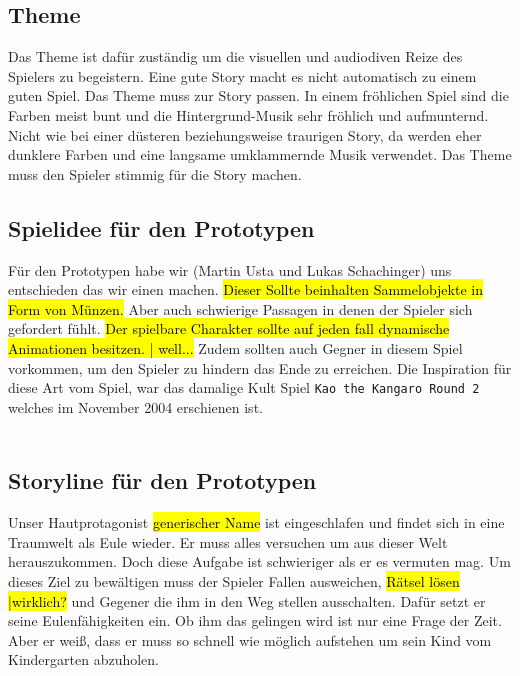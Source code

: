 \subsection{Theme}
Das Theme ist dafür zuständig um die visuellen und audiodiven Reize des Spielers zu begeistern. Eine gute Story macht es nicht automatisch zu einem guten Spiel. Das Theme muss zur Story passen. In einem fröhlichen Spiel sind die Farben meist bunt und die Hintergrund-Musik sehr fröhlich und aufmunternd. Nicht wie bei einer düsteren beziehungsweise traurigen Story, da werden eher dunklere Farben und eine langsame umklammernde Musik verwendet. Das Theme muss den Spieler stimmig für die Story machen.


\subsection{Spielidee für den Prototypen}
Für den Prototypen habe wir (Martin Usta und Lukas Schachinger) uns entschieden das wir einen  machen. \hl{Dieser Sollte beinhalten Sammelobjekte in Form von Münzen.} Aber auch schwierige Passagen in denen der Spieler sich gefordert fühlt. \hl{Der spielbare Charakter sollte auf jeden fall dynamische Animationen besitzen. | well...} Zudem sollten auch Gegner in diesem Spiel vorkommen, um den Spieler zu hindern das Ende zu erreichen. Die Inspiration für diese Art vom Spiel, war das damalige Kult Spiel \verb+Kao the Kangaro Round 2+ welches im November 2004 erschienen ist.\\\\

\subsection{Storyline für den Prototypen}
Unser Hautprotagonist \hl{ generischer Name } ist eingeschlafen und findet sich in eine Traumwelt als Eule wieder. Er muss alles versuchen um aus dieser Welt herauszukommen. Doch diese Aufgabe ist schwieriger als er es vermuten mag. Um dieses Ziel zu bewältigen muss der Spieler Fallen ausweichen, \hl{Rätsel lösen |wirklich?} und Gegener die ihm in den Weg stellen ausschalten. Dafür setzt er seine Eulenfähigkeiten ein. Ob ihm das gelingen wird ist nur eine Frage der Zeit. Aber er weiß, dass er muss so schnell wie möglich aufstehen um sein Kind vom Kindergarten abzuholen.


